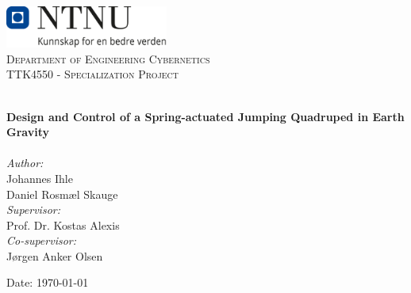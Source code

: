 
\begin{titlepage}
\vbox{ }
\vbox{ }
\begin{center}
\includegraphics[width=0.40\textwidth]{Images/NTNU_logo.png}\\[1cm]
\textsc{\LARGE Department of Engineering Cybernetics}\\[1.5cm]
\textsc{\Large TTK4550 - Specialization Project}\\[0.5cm]
\vbox{ }

\HRule \\[0.4cm]
{ \huge \bfseries Design and Control of a Spring-actuated Jumping Quadruped in Earth Gravity}\\[0.4cm]
\HRule \\[1.5cm]

\large
\emph{Author:}\\
Johannes Ihle\\
Daniel Rosmæl Skauge\\
\vspace{1em}
\emph{Supervisor:}\\
Prof. Dr. Kostas Alexis\\
\vspace{1em}
\emph{Co-supervisor:}\\
Jørgen Anker Olsen
\vfill

{\large Date: \today}
\end{center}
\end{titlepage}